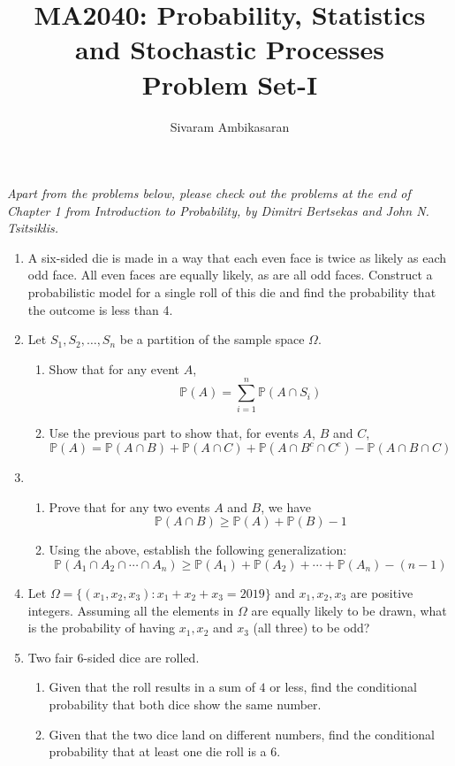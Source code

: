 \documentclass{article}
\title{MA2040: Probability, Statistics and Stochastic Processes\\
Problem Set-I}
\date{}
\author{Sivaram Ambikasaran}
\newcommand{\dsum}{\displaystyle\sum}
\newcommand{\dcap}{\displaystyle\cap}
\newcommand{\Pb}{\mathbb{P}}
\newcommand{\bkt}[1]{\left(#1\right)}
\begin{document}
	\maketitle
	\emph{Apart from the problems below, please check out the problems at the end of Chapter 1 from Introduction to Probability, by Dimitri Bertsekas and John N. Tsitsiklis.}
	\begin{enumerate}
		\item
		A six-sided die is made in a way that each even face is twice as likely as each odd face. All even faces are equally likely, as are all odd faces. Construct a probabilistic model for a single roll of this die and find the probability that the outcome is less than 4.
		\item
		Let $S_1,S_2,\ldots,S_n$ be a partition of the sample space $\Omega$.
		\begin{enumerate}
			\item
			Show that for any event $A$,
			$$\Pb(A) = \dsum_{i=1}^n \Pb\bkt{A \dcap S_i}$$
			\item
			Use the previous part to show that, for events $A$, $B$ and $C$,
			$$\Pb\bkt{A} = \Pb\bkt{A \dcap B} + \Pb\bkt{A \dcap C} + \Pb\bkt{A \dcap B^c \dcap C^c} - \Pb\bkt{A \dcap B \dcap C}$$
		\end{enumerate}
		\item
		\begin{enumerate}
			\item
			Prove that for any two events $A$ and $B$, we have
			$$\Pb\bkt{A \dcap B} \geq \Pb(A) + \Pb(B) - 1$$
			\item
			Using the above, establish the following generalization:
			$$\Pb\bkt{A_1 \dcap A_2 \dcap \cdots \dcap A_n} \geq \Pb\bkt{A_1} + \Pb\bkt{A_2} + \cdots + \Pb\bkt{A_n} - \bkt{n-1}$$
		\end{enumerate}
		\item
		Let $\Omega = \{\bkt{x_1,x_2,x_3}: x_1+x_2+x_3 = 2019\}$ and $x_1,x_2,x_3$ are positive integers. Assuming all the elements in $\Omega$ are equally likely to be drawn, what is the probability of having $x_1,x_2$ and $x_3$ (all three) to be odd?
		\item
		Two fair $6$-sided dice are rolled.
		\begin{enumerate}
			\item
			Given that the roll results in a sum of $4$ or less, find the conditional probability that both dice show the same number.
			\item
			Given that the two dice land on different numbers, find the conditional probability that at least one die roll is a $6$.

\end{enumerate}
\end{enumerate}
\end{document}
